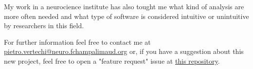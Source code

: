 \documentclass[10pt,a4paper]{report}
\begin{document}
My work in a neurocience institute has also tought me what kind of analysis are more often needed and what type of software is considered intuitive or unintuitive by researchers in this field.

For further information feel free to contact me at \href{mailto:pietro.vertechi@neuro.fchampalimaud.org}{pietro.vertechi@neuro.fchampalimaud.org} or, if you have a suggestion about this new project, feel free to open a "feature request" issue at \href{https://github.com/piever/Sputnik.jl}{this repository}.
\end{document}
